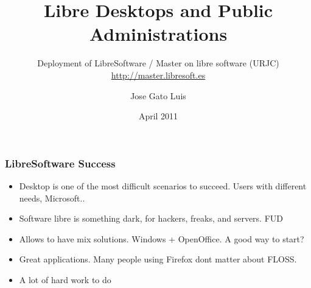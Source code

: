 \documentclass{beamer}
\begin{document}
\title{Libre Desktops and Public Administrations}
\subtitle{ Deployment of LibreSoftware / Master on libre software (URJC) \\
\url{http://master.libresoft.es}}
\author{Jose Gato Luis}

\date{April 2011}







\begin{frame}
\frametitle{LibreSoftware Success }

\begin{itemize}
\item Desktop is one of the most difficult scenarios to succeed. Users with different needs, Microsoft..
\item Software libre is something dark, for hackers, freaks, and servers. FUD
\item Allows to have mix solutions. Windows + OpenOffice. A good way to start?
\item Great applications. Many people using Firefox dont matter about FLOSS.
\item A lot of hard work to do
\end{itemize}

\end{frame}
\end{document}
